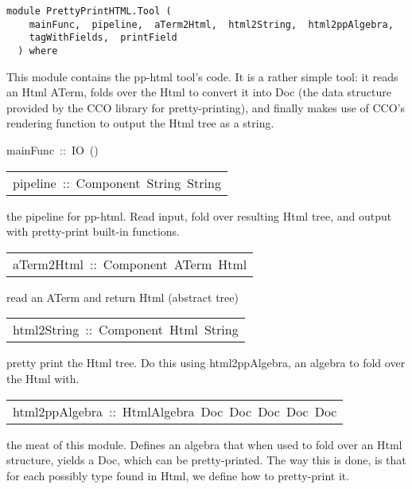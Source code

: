 \label{module:PrettyPrintHTML.Tool}
\haddockbeginheader
{\haddockverb\begin{verbatim}
module PrettyPrintHTML.Tool (
    mainFunc,  pipeline,  aTerm2Html,  html2String,  html2ppAlgebra, 
    tagWithFields,  printField
  ) where\end{verbatim}}
\haddockendheader

This module contains the pp-html tool's code. It is a rather simple tool: it 
 reads an Html ATerm, folds over the Html to convert it into Doc (the data structure provided
 by the CCO library for pretty-printing), and finally makes use of CCO's rendering function
 to output the Html tree as a string. 
\par

\begin{haddockdesc}
\item[
mainFunc\ ::\ IO\ ()
]
\end{haddockdesc}
\begin{haddockdesc}
\item[\begin{tabular}{@{}l}
pipeline\ ::\ Component\ String\ String
\end{tabular}]\haddockbegindoc
the pipeline for pp-html. Read input, fold over resulting Html tree, and 
 output with pretty-print built-in functions. 
\par

\end{haddockdesc}
\begin{haddockdesc}
\item[\begin{tabular}{@{}l}
aTerm2Html\ ::\ Component\ ATerm\ Html
\end{tabular}]\haddockbegindoc
read an ATerm and return Html (abstract tree)
\par

\end{haddockdesc}
\begin{haddockdesc}
\item[\begin{tabular}{@{}l}
html2String\ ::\ Component\ Html\ String
\end{tabular}]\haddockbegindoc
pretty print the Html tree. Do this using html2ppAlgebra, an algebra to fold 
 over the Html with. 
\par

\end{haddockdesc}
\begin{haddockdesc}
\item[\begin{tabular}{@{}l}
html2ppAlgebra\ ::\ HtmlAlgebra\ Doc\ Doc\ Doc\ Doc\ Doc
\end{tabular}]\haddockbegindoc
the meat of this module. Defines an algebra that when used to fold over an Html 
 structure, yields a Doc, which can be pretty-printed. The way this is done, is that 
 for each possibly type found in Html, we define how to pretty-print it.
\par

\end{haddockdesc}
